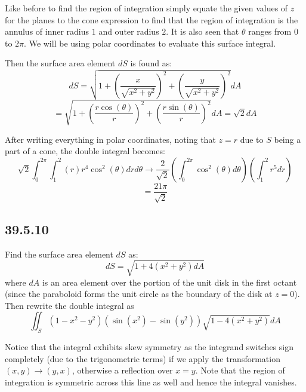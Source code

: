 \documentclass{article}
\begin{document}
Like before to find the region of integration simply equate the given values of $z$ for the planes to the cone expression to find that the region of integration is the annulus of inner radius $1$ and outer radius $2$. It is also seen that $\theta$ ranges from $0$ to $2\pi$. We will be using polar coordinates to evaluate this surface integral.

Then the surface area element $dS$ is found as:
$$dS = \sqrt{1+\left(\frac{x}{\sqrt{x^2+y^2}}\right)^2+\left(\frac{y}{\sqrt{x^2+y^2}}\right)^2}dA$$
$$ = \sqrt{1+\left(\frac{r\cos(\theta)}{r}\right)^2+\left(\frac{r\sin(\theta)}{r}\right)^2}dA= \sqrt{2}dA$$

After writing everything in polar coordinates, noting that $z=r$ due to $S$ being a part of a cone, the double integral becomes:
$$\sqrt{2}\int_0^{2\pi}\int_1^2 (r)r^4\cos^2(\theta)drd\theta \to \frac{2}{\sqrt{2}}\left(\int_0^{2\pi}\cos^2(\theta)d\theta\right)\left(\int_1^2 r^5dr\right)$$
$$= \frac{21\pi}{\sqrt{2}}$$

\subsection{39.5.10}

Find the surface area element $dS$ as:
$$dS = \sqrt{1+4(x^2+y^2)dA}$$ where $dA$ is an area element over the portion of the unit disk in the first octant (since the paraboloid forms the unit circle as the boundary of the disk at $z=0$). Then rewrite the double integral as $$\iint_S (1-x^2-y^2)(\sin(x^2)-\sin(y^2))\sqrt{1-4(x^2+y^2)}dA$$

Notice that the integral exhibits skew symmetry as the integrand switches sign completely (due to the trigonometric terms) if we apply the transformation $(x,y)\to (y,x)$, otherwise a reflection over $x=y$. Note that the region of integration is symmetric across this line as well and hence the integral vanishes.
\end{document}
